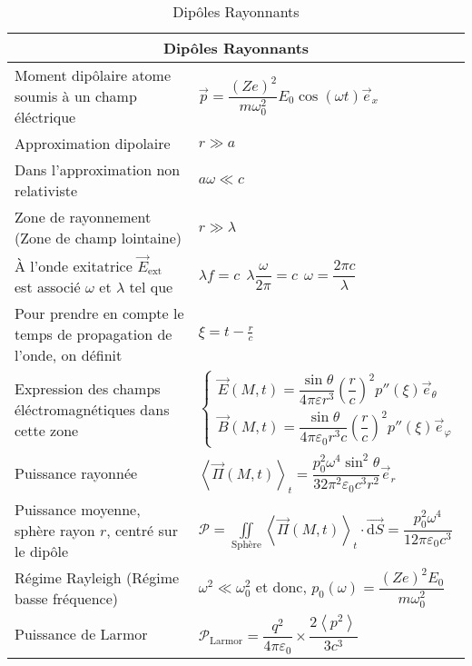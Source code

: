 \documentclass[10pt,a4paper,titlepage,landscape]{article}
\renewcommand{\d}
{
    \mathrm{d}
}
\renewcommand{\arraystretch}{2}
\newcommand{\av}[2]
{
    \left\langle#1\right\rangle_{#2}
}
\begin{document}
\begin{table}[H]
    \centering
    \renewcommand{\arraystretch}{1.5} %
    \setlength{\tabcolsep}{8pt} %
    \begin{tabular}{@{}|p{9cm}|p{10cm}@{}|}

        \multicolumn{2}{c}{\textbf{Dipôles Rayonnants}} \\ \hline

        Moment dipôlaire atome soumis à un champ éléctrique & $\vec p = \dfrac{(Ze)^2}{m\omega_0^2}E_0\cos(\omega t)\vec e_x$ \\ \hline
        Approximation dipolaire & $r \gg a$ \\ \hline 
        Dans l'approximation non relativiste & $a\omega \ll c$ \\ \hline
        Zone de rayonnement (Zone de champ lointaine) & $r \gg \lambda$ \\ \hline
        À l'onde exitatrice $\vec E_{\text{ext}}$ est associé $\omega$ et $\lambda$ tel que & $\lambda f = c \ \ \lambda\dfrac{\omega}{2\pi} = c \ \ \omega = \dfrac{2\pi c}{\lambda}$ \\ \hline
        Pour prendre en compte le temps de propagation de l'onde, on définit & $\xi = t - \frac{r}{c}$ \\ \hline
        Expression des champs éléctromagnétiques dans cette zone & $\left\{ \begin{array}{l} \vec E (M,t) = \dfrac{\sin \theta}{4\pi \varepsilon r^3} \left(\dfrac{r}{c}\right)^2 p''(\xi)\vec e_{\theta} \\ \hline \vec B (M,t) = \dfrac{\sin \theta}{4\pi \varepsilon_0 r^3 c}\left(\dfrac{r}{c}\right)^2 p''(\xi) \vec e_{\varphi}\end{array}\right.$ \\ \hline
        Puissance rayonnée & $\av{\vec{\Pi} (M,t)}{t} = \dfrac{p_0^2 \omega^4 \sin^2 \theta}{32 \pi^2 \varepsilon_0 c^3 r^2}\vec e_r$ \\ \hline
        Puissance moyenne, sphère rayon $r$, centré sur le dipôle & $\displaystyle \mathcal{P} = \iint\limits_{\text{Sphère}} \av{\vec \Pi (M,t)}{t} \cdot \vec{\d S} = \dfrac{p_0^2 \omega^4}{12\pi \varepsilon_0 c^3}$ \\ \hline
        Régime Rayleigh (Régime basse fréquence) & $\omega^2 \ll \omega_0^2$ et donc, $p_0(\omega) = \dfrac{(Ze)^2E_0}{m\omega_0^2}$ \\ \hline
        Puissance de Larmor & $\mathcal P_{\text{Larmor}} = \dfrac{q^2}{4\pi \varepsilon_0} \times \dfrac{2\av{p^2}{}}{3c^3}$ \\ \hline


    \end{tabular}
\caption{Dipôles Rayonnants}
\label{tab:der}
\end{table}
\end{document}
